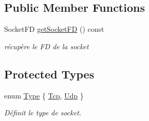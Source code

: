 \subsection*{Public Member Functions}
\begin{DoxyCompactItemize}
\item 
Socket\-F\-D \hyperlink{classmognetwork_1_1_socket_a6fc34e842d4efbd526697a12e826806a}{get\-Socket\-F\-D} () const 
\begin{DoxyCompactList}\small\item\em récupère le F\-D de la socket \end{DoxyCompactList}\end{DoxyCompactItemize}
\subsection*{Protected Types}
\begin{DoxyCompactItemize}
\item 
enum \hyperlink{classmognetwork_1_1_socket_a70fb1fd697cfe89987e81bbe9db8ea4d}{Type} \{ \hyperlink{classmognetwork_1_1_socket_a70fb1fd697cfe89987e81bbe9db8ea4dad6adab633c51e7fd9780763f821bea67}{Tcp}, 
\hyperlink{classmognetwork_1_1_socket_a70fb1fd697cfe89987e81bbe9db8ea4dac91debddee39f30455177839f94bdde6}{Udp}
 \}
\begin{DoxyCompactList}\small\item\em Définit le type de socket. \end{DoxyCompactList}\end{DoxyCompactItemize}
